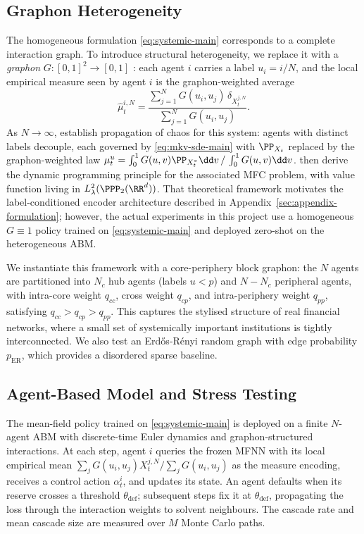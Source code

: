 \documentclass[11pt]{article}
\begin{document}
\subsection{Graphon Heterogeneity}

The homogeneous formulation \eqref{eq:systemic-main} corresponds to a complete interaction graph. To introduce structural heterogeneity, we replace it with a \emph{graphon} $G:[0,1]^2 \to [0,1]$ \citep{lovasz2012large}: each agent $i$ carries a label $u_i = i/N$, and the local empirical measure seen by agent $i$ is the graphon-weighted average
\begin{equation}\label{eq:local-measure}
  \hat\mu_t^{i,N} = \frac{\sum_{j=1}^N G(u_i,u_j)\,\delta_{X_t^{j,N}}}{\sum_{j=1}^N G(u_i,u_j)}.
\end{equation}
As $N\to\infty$, \citet{coppini2025graphon} establish propagation of chaos for this system: agents with distinct labels decouple, each governed by \eqref{eq:mkv-sde-main} with $\PP_{X_t}$ replaced by the graphon-weighted law $\mu_t^u = \int_0^1 G(u,v)\PP_{X_t^v}\dd v \,/\, \int_0^1 G(u,v)\dd v$. \citet{decrescenzo2025mfc} then derive the dynamic programming principle for the associated MFC problem, with value function living in $L^2_\lambda(\PPP_2(\RR^d))$. That theoretical framework motivates the label-conditioned encoder architecture described in Appendix~\ref{sec:appendix-formulation}; however, the actual experiments in this project use a homogeneous $G\equiv 1$ policy trained on \eqref{eq:systemic-main} and deployed zero-shot on the heterogeneous ABM.

We instantiate this framework with a core-periphery block graphon: the $N$ agents are partitioned into $N_c$ hub agents (labels $u < p$) and $N - N_c$ peripheral agents, with intra-core weight $q_{cc}$, cross weight $q_{cp}$, and intra-periphery weight $q_{pp}$, satisfying $q_{cc} > q_{cp} > q_{pp}$. This captures the stylised structure of real financial networks, where a small set of systemically important institutions is tightly interconnected. We also test an Erdős-Rényi random graph with edge probability $p_{\mathrm{ER}}$, which provides a disordered sparse baseline.

\subsection{Agent-Based Model and Stress Testing}

The mean-field policy trained on \eqref{eq:systemic-main} is deployed on a finite $N$-agent ABM with discrete-time Euler dynamics and graphon-structured interactions. At each step, agent $i$ queries the frozen MFNN with its local empirical mean $\sum_j G(u_i, u_j) X_t^{j,N} / \sum_j G(u_i, u_j)$ as the measure encoding, receives a control action $\alpha_t^i$, and updates its state. An agent defaults when its reserve crosses a threshold $\theta_{\mathrm{def}}$; subsequent steps fix it at $\theta_{\mathrm{def}}$, propagating the loss through the interaction weights to solvent neighbours. The cascade rate and mean cascade size are measured over $M$ Monte Carlo paths.
\end{document}
